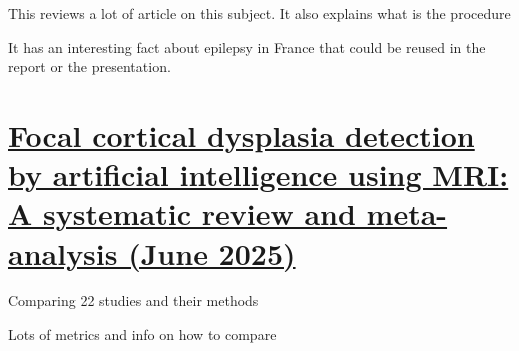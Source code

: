 This reviews a lot of article on this subject.
It also explains what is the procedure

It has an interesting fact about epilepsy in France that could be reused in the report or the presentation.

\section{\href{https://www.sciencedirect.com/science/article/pii/S1525505025001428}{Focal cortical dysplasia detection by artificial intelligence using MRI: A systematic review and meta-analysis (June 2025)}}

Comparing 22 studies and their methods

Lots of metrics and info on how to compare
